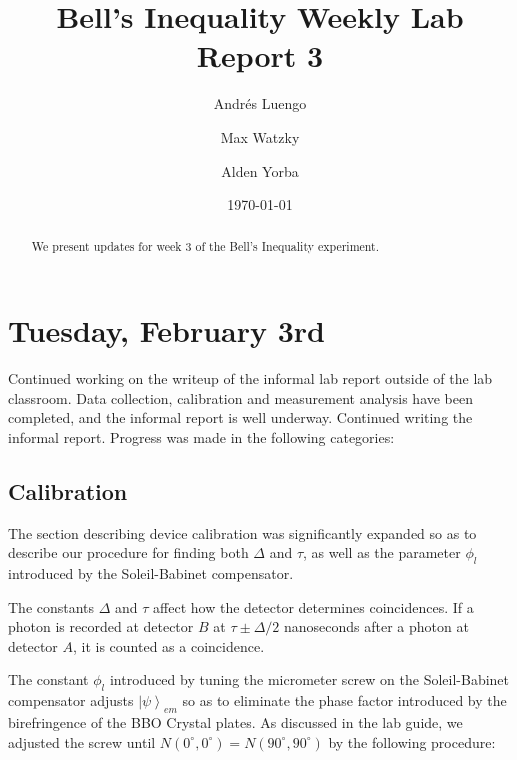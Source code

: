 \documentclass[letter,scriptaddress,twocolumn, prl,showkeys]{revtex4}
\newcommand{\ket}[1]{\left| #1 \right\rangle}
\begin{document}
\title{Bell's Inequality Weekly Lab Report 3}

\author{Andr\'{e}s Luengo} 
\author{Max Watzky} 
\author{Alden Yorba}


\date{\today}

\begin{abstract}
  We present updates for week 3 of the Bell's Inequality experiment.
\end{abstract}


\maketitle

\section{Tuesday, February 3rd}

Continued working on the writeup of the informal lab report outside of the lab classroom. Data collection, calibration and measurement analysis have been completed, and the informal report is well underway. Continued writing the informal report. Progress was made in the following categories:

\subsection{Calibration}

The section describing device calibration was significantly expanded so as to describe our procedure for finding both $\Delta$ and $\tau$, as well as the parameter $\phi_l$ introduced by the Soleil-Babinet compensator. 

The constants $\Delta$ and $\tau$ affect how the detector determines coincidences. If a photon is recorded at detector $B$ at $\tau \pm \Delta / 2$ nanoseconds after a photon at detector $A$, it is counted as a coincidence.

The constant $\phi_l$ introduced by tuning the micrometer screw on the Soleil-Babinet compensator adjusts $\ket{\psi}_{em}$ so as to eliminate the phase factor introduced by the birefringence of the BBO Crystal plates. As discussed in the lab guide, we adjusted the screw until $N(0^\circ, 0^\circ)=N(90^\circ, 90^\circ)$ by the following procedure:
\end{document}
